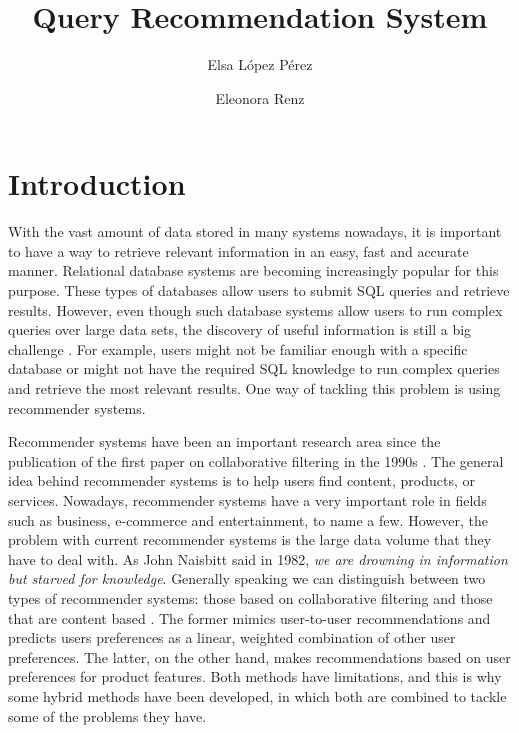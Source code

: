 \documentclass[sigconf]{acmart}
\begin{document}
\title{Query Recommendation System}

\author{Elsa López Pérez}

\author{Eleonora Renz}

\maketitle

\section{Introduction}
With the vast amount of data stored in many systems nowadays, it is important to have a way to retrieve relevant information in an easy, fast and accurate manner. Relational database systems are becoming increasingly popular for this purpose. These types of databases allow users to submit SQL queries and retrieve results. However, even though such database systems allow users to run complex queries over large data sets, the discovery of useful information is still a big challenge \cite{QueRIE}. For example, users might not be familiar enough with a specific database or might not have the required SQL knowledge to run complex queries and retrieve the most relevant results. One way of tackling this problem is using recommender systems.

Recommender systems have been an important research area since the publication of the first paper on collaborative filtering in the 1990s \cite{Resnick1994GroupLensAO}. The general idea behind recommender systems is to help users find content, products, or services. Nowadays, recommender systems have a very important role in fields such as business, e-commerce and entertainment, to name a few. However, the problem with current recommender systems is the large data volume that they have to deal with. As John Naisbitt said in 1982, \textit{we are drowning in information but starved for knowledge}. Generally speaking we can distinguish between two types of recommender systems: those based on collaborative filtering and those that are content based \cite{PARK201210059}. The former mimics user-to-user recommendations and predicts users preferences as a linear, weighted combination of other user preferences. The latter, on the other hand, makes recommendations based on user preferences for product features. Both methods have limitations, and this is why some hybrid methods have been developed, in which both are combined to tackle some of the problems they have.
\end{document}

